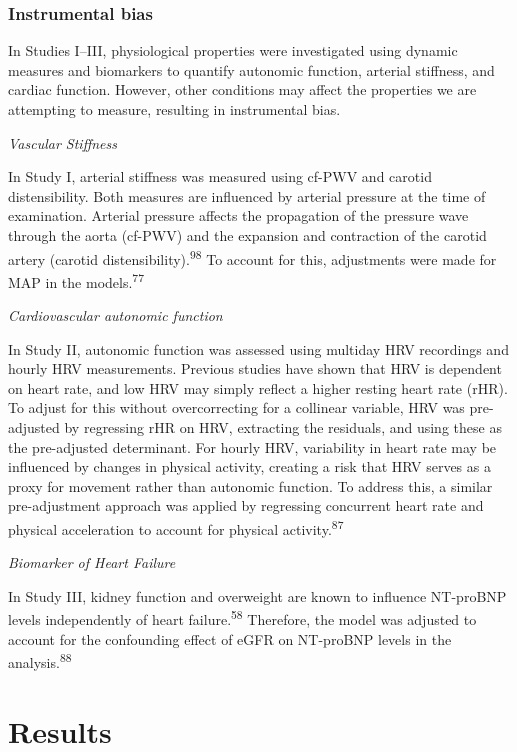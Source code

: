 \documentclass[
  a4paper,
  headsepline=true,
  open=left]{scrbook}
\begin{document}
\hypertarget{instrumental-bias}{%
\subsection{Instrumental bias}\label{instrumental-bias}}

In Studies I--III, physiological properties were investigated using
dynamic measures and biomarkers to quantify autonomic function, arterial
stiffness, and cardiac function. However, other conditions may affect
the properties we are attempting to measure, resulting in instrumental
bias.

\emph{Vascular Stiffness}

In Study I, arterial stiffness was measured using cf-PWV and carotid
distensibility. Both measures are influenced by arterial pressure at the
time of examination. Arterial pressure affects the propagation of the
pressure wave through the aorta (cf-PWV) and the expansion and
contraction of the carotid artery (carotid
distensibility).\textsuperscript{98} To account for this, adjustments
were made for MAP in the models.\textsuperscript{77}

\emph{Cardiovascular autonomic function}

In Study II, autonomic function was assessed using multiday HRV
recordings and hourly HRV measurements. Previous studies have shown that
HRV is dependent on heart rate, and low HRV may simply reflect a higher
resting heart rate (rHR). To adjust for this without overcorrecting for
a collinear variable, HRV was pre-adjusted by regressing rHR on HRV,
extracting the residuals, and using these as the pre-adjusted
determinant. For hourly HRV, variability in heart rate may be influenced
by changes in physical activity, creating a risk that HRV serves as a
proxy for movement rather than autonomic function. To address this, a
similar pre-adjustment approach was applied by regressing concurrent
heart rate and physical acceleration to account for physical
activity.\textsuperscript{87}

\emph{Biomarker of Heart Failure}

In Study III, kidney function and overweight are known to influence
NT-proBNP levels independently of heart failure.\textsuperscript{58}
Therefore, the model was adjusted to account for the confounding effect
of eGFR on NT-proBNP levels in the analysis.\textsuperscript{88}


\hypertarget{results}{%
\chapter{Results}\label{results}}
\end{document}
